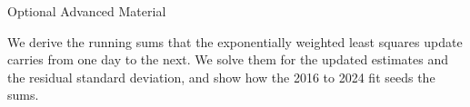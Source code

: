 \begin{frame}{Optional Advanced Material}
  \vspace{0.2em}
  {\normalsize\textbf{} \par
  \href{\repo/advanced/ewls/CHEME-5660-L15a-Derivation-EWLS-Update-Fall-2026.ipynb}{}}

  \vspace{0.3em}
  We derive the running sums that the exponentially weighted least squares update carries from
  one day to the next. We solve them for the updated estimates and the residual standard deviation,
  and show how the 2016 to 2024 fit seeds the sums.
\end{frame}
